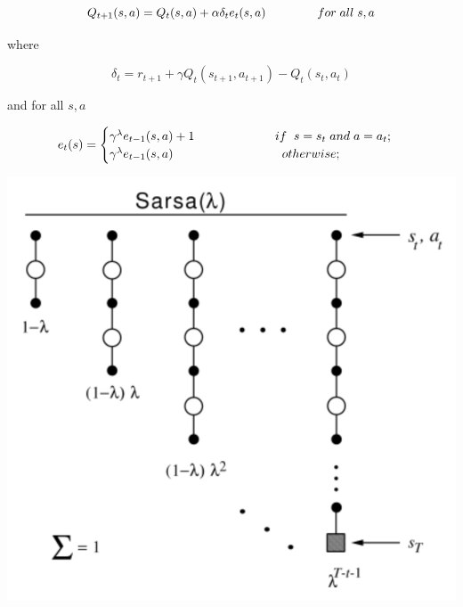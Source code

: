 \documentclass[11pt]{article}
\theoremstyle{plain}
\theoremstyle{definition}
\begin{document}
\begin{equation}
Q_{t+1}(s,a) = Q_t(s,a)+\alpha \delta_t e_t(s,a) \hspace{1.5cm} for\hspace{0.1cm} all \hspace{0.1cm}s,a
\end{equation}

where

\begin{equation}
\delta_t = r_{t+1} + \gamma Q_t(s_{t+1},a_{t+1})-Q_t(s_t,a_t)
\end{equation}

and for all $s, a$

\begin{equation}
e_t(s) = 
\begin{cases}
\gamma^\lambda e_{t-1}(s,a)+1 \hspace{2.3cm} if  \hspace{0.2cm}  s = s_t \hspace{0.1cm}and \hspace{0.1cm}a=a_t;\\
\gamma^\lambda e_{t-1}(s,a) \hspace{3cm} \hspace{0.1cm} otherwise;
\end{cases}
\end{equation} 

\begin{center}
\includegraphics[scale=0.7]{6}
\end{center}
\end{document}
